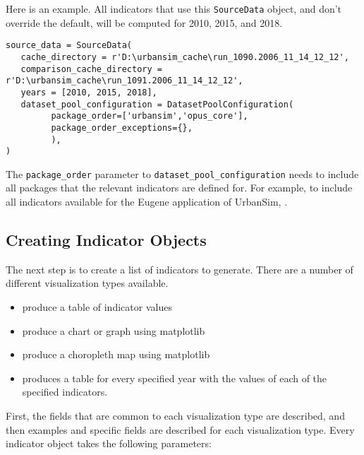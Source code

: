 Here is an example. All indicators that use this \verb|SourceData| object, and don't
override the default, will be computed for 2010, 2015, and 2018. 

\begin{verbatim}
source_data = SourceData(
   cache_directory = r'D:\urbansim_cache\run_1090.2006_11_14_12_12',
   comparison_cache_directory = r'D:\urbansim_cache\run_1091.2006_11_14_12_12',
   years = [2010, 2015, 2018],
   dataset_pool_configuration = DatasetPoolConfiguration(
         package_order=['urbansim','opus_core'],
         package_order_exceptions={},
         ),                  
)
\end{verbatim}

The \verb|package_order| parameter to \verb|dataset_pool_configuration| needs to
include all packages that the relevant indicators are defined for. For example,
to include all indicators available for the Eugene application of UrbanSim,
.

\subsection{Creating Indicator Objects}

The next step is to create a list of indicators to generate. There are a 
number of different visualization types available. 

\begin{itemize}
\tight
\item {}  produce a table  of indicator \indicatorsindex values
\item {}  produce a chart  or graph  using matplotlib \matplotlibindex
\item {}  produce a choropleth map  using matplotlib \matplotlibindex
\item {} produces a table for every specified year 
with the values of each of the specified indicators.
\end{itemize}

First, the fields 
that are common to each visualization type are described, and then examples and
specific fields are described for each visualization type. Every indicator 
object takes the following parameters:

